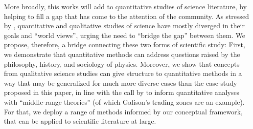 \documentclass[smallextended]{svjour3}
\begin{document}





More broadly, this works will add to quantitative studies of science literature, by helping to fill a gap that has come to the attention of the community.  As stressed by \citet{Kang2020,Leydesdorff2020,Bowker2020}, quantitative and qualitative studies of science have mostly diverged in their goals and ``world views'', urging the need to ``bridge the gap'' between them. We propose, therefore, a bridge connecting these two forms of scientific study: First, we demonstrate that quantitative methods can address questions raised by the philosophy, history, and sociology of physics. Moreover, we show that concepts from qualitative 
 science studies can give structure to quantitative methods in a way that may be generalized for much more diverse cases than the case-study proposed in this paper, in line with the call by \citealt{Heinze2020} to inform quantitative analyses with ``middle-range theories'' (of which Galison's trading zones are an example). For that, we deploy a range of methods informed by our conceptual framework, that can be applied to scientific literature at large.
\end{document}
